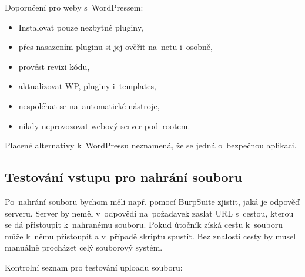 Doporučení pro weby s~WordPressem:

\begin{itemize}
    \item Instalovat pouze nezbytné pluginy,
    \item přes nasazením pluginu si jej ověřit na~netu i~osobně,
    \item provést revizi kódu,
    \item aktualizovat WP, pluginy i~templates,
    \item nespoléhat se na~automatické nástroje,
    \item nikdy neprovozovat webový server pod~rootem.
\end{itemize}

Placené alternativy k~WordPressu neznamená, že se jedná o~bezpečnou aplikaci.

\subsection{Testování vstupu pro nahrání souboru}

Po~nahrání souboru bychom měli např. pomocí BurpSuite zjistit, jaká je odpověď serveru. Server by neměl v~odpovědi na~požadavek zaslat URL s~cestou, kterou se dá přistoupit k~nahranému souboru. Pokud útočník získá cestu k~souboru může k~němu přistoupit a v~případě skriptu spustit. Bez znalosti cesty by musel manuálně procházet celý souborový systém.

Kontrolní seznam pro testování uploadu souboru:

